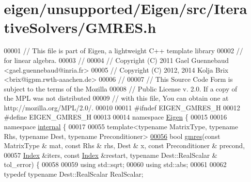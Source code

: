 \hypertarget{eigen_2unsupported_2_eigen_2src_2_iterative_solvers_2_g_m_r_e_s_8h_source}{}\section{eigen/unsupported/\+Eigen/src/\+Iterative\+Solvers/\+G\+M\+R\+ES.h}
\label{eigen_2unsupported_2_eigen_2src_2_iterative_solvers_2_g_m_r_e_s_8h_source}

\begin{DoxyCode}
00001 \textcolor{comment}{// This file is part of Eigen, a lightweight C++ template library}
00002 \textcolor{comment}{// for linear algebra.}
00003 \textcolor{comment}{//}
00004 \textcolor{comment}{// Copyright (C) 2011 Gael Guennebaud <gael.guennebaud@inria.fr>}
00005 \textcolor{comment}{// Copyright (C) 2012, 2014 Kolja Brix <brix@igpm.rwth-aaachen.de>}
00006 \textcolor{comment}{//}
00007 \textcolor{comment}{// This Source Code Form is subject to the terms of the Mozilla}
00008 \textcolor{comment}{// Public License v. 2.0. If a copy of the MPL was not distributed}
00009 \textcolor{comment}{// with this file, You can obtain one at http://mozilla.org/MPL/2.0/.}
00010 
00011 \textcolor{preprocessor}{#ifndef EIGEN\_GMRES\_H}
00012 \textcolor{preprocessor}{#define EIGEN\_GMRES\_H}
00013 
00014 \textcolor{keyword}{namespace }\hyperlink{namespace_eigen}{Eigen} \{
00015 
00016 \textcolor{keyword}{namespace }\hyperlink{namespaceinternal}{internal} \{
00017 
00055 \textcolor{keyword}{template}<\textcolor{keyword}{typename} MatrixType, \textcolor{keyword}{typename} Rhs, \textcolor{keyword}{typename} Dest, \textcolor{keyword}{typename} Preconditioner>
\hyperlink{namespace_eigen_1_1internal_a851df31ae9133639a8eb3f6a8484bbf7}{00056} \textcolor{keywordtype}{bool} \hyperlink{namespace_eigen_1_1internal_a851df31ae9133639a8eb3f6a8484bbf7}{gmres}(\textcolor{keyword}{const} MatrixType & mat, \textcolor{keyword}{const} Rhs & rhs, Dest & x, \textcolor{keyword}{const} Preconditioner & precond,
00057     \hyperlink{namespace_eigen_a62e77e0933482dafde8fe197d9a2cfde}{Index} &iters, \textcolor{keyword}{const} \hyperlink{namespace_eigen_a62e77e0933482dafde8fe197d9a2cfde}{Index} &restart, \textcolor{keyword}{typename} Dest::RealScalar & tol\_error) \{
00058 
00059   \textcolor{keyword}{using} std::sqrt;
00060   \textcolor{keyword}{using} std::abs;
00061 
00062   \textcolor{keyword}{typedef} \textcolor{keyword}{typename} Dest::RealScalar RealScalar;

\end{DoxyCode}
